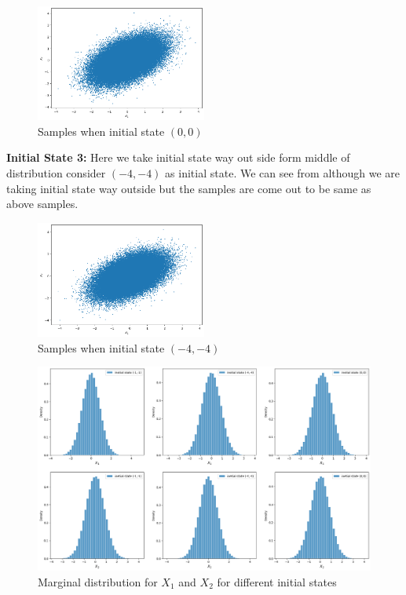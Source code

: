\begin{example}
    \begin{figure}[H]
        \centering
        \includegraphics[width=0.5\textwidth]{images/gibbs/example1/init2.png}
        \caption{Samples when initial state $(0,0)$}
    \end{figure}

    \textbf{Initial State 3:} Here we take initial state way out side form middle of distribution consider $ (-4,-4) $ as initial state. We can see from  although we are taking initial state way outside but the samples are come out to be same as above samples. 


    \begin{figure}[H]
        \centering
        \includegraphics[width=0.5\textwidth]{images/gibbs/example1/init3.png}
        \caption{Samples when initial state $(-4,-4)$}
        \label{fig:gb ex1 sample 3}
    \end{figure}

    \begin{figure}[H]
        \centering
        \includegraphics[width=1\textwidth]{images/gibbs/example1/marginal-distributions.png}
        \caption{Marginal distribution for $ X_1 $ and $ X_2 $ for different initial states}
    \end{figure}

\end{example}

